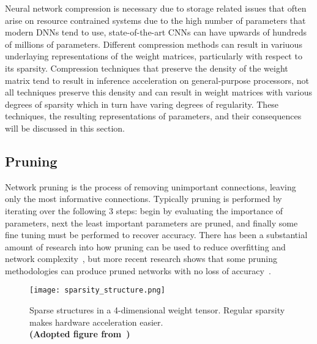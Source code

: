 \documentclass[../../D1.tex]{subfiles}
\begin{document}
Neural network compression is necessary due to storage related issues that often arise on resource contrained systems due to the high number of parameters that modern DNNs tend to use, state-of-the-art CNNs can have upwards of hundreds of millions of parameters. 
Different compression methods can result in variuous underlaying representations of the weight matrices, particularly with respect to its sparsity. 
Compression techniques that preserve the density of the weight matrix tend to result in inference acceleration on general-purpose processors\autocite{lebedevSpeedingupConvolutionalNeural2015,zhangAcceleratingVeryDeep2016}, not all techniques preserve this density and can result in weight matrices with various degrees of sparsity which in turn have varing degrees of regularity. 
These techniques, the resulting representations of parameters, and their consequences will be discussed in this section.

\subsection{Pruning}\label{sec:Pruning}
Network pruning is the process of removing unimportant connections, leaving only the most informative connections.
Typically pruning is performed by iterating over the following 3 steps: begin by evaluating the importance of parameters, next the least important parameters are pruned, and finally some fine tuning must be performed to recover accuracy.
There has been a substantial amount of research into how pruning can be used to reduce overfitting and network complexity~\autocite{hansonComparingBiasesMinimal,hassibiSecondOrderDerivatives,lecunOptimalBrainDamage,stromPhonemeProbabilityEstimation1997}, but more recent research shows that some pruning methodologies can produce pruned networks with no loss of accuracy~\autocite{hanLearningBothWeights2015}.

\begin{figure}[H]
    \begin{center}
        \texttt{[image: sparsity\_structure.png]} 
    \end{center}
    
    \caption{Sparse structures in a 4-dimensional weight tensor. Regular sparsity makes hardware acceleration easier.\\ \textbf{(Adopted figure from~\autocite{maoExploringRegularitySparse2017})}}
    \label{fig:SparsityRegularity}   
\end{figure}
\end{document}
